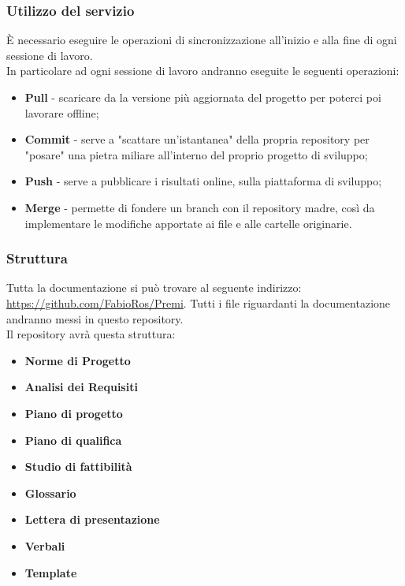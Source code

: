 		\subsubsection{Utilizzo del servizio}
È necessario eseguire le operazioni di sincronizzazione all'inizio e alla fine di ogni sessione di lavoro. \\
In particolare ad ogni sessione di lavoro andranno eseguite le seguenti operazioni:
\begin{itemize}
	\item \textbf{Pull} - scaricare da la versione più aggiornata del progetto per poterci poi lavorare offline;
	\item \textbf{Commit} - serve a "scattare un'istantanea" della propria \gls{repository} per "posare" una pietra miliare all'interno del proprio progetto di sviluppo;
	\item \textbf{Push} - serve a pubblicare i risultati online, sulla piattaforma di sviluppo;
	\item \textbf{Merge} - permette di fondere un \gls{branch} con il \gls{repository} madre, così da implementare le modifiche apportate ai file e alle cartelle originarie.
\end{itemize}

		\subsubsection{Struttura}
Tutta la documentazione si può trovare al seguente indirizzo: \url{https://github.com/FabioRos/Premi}. Tutti i file riguardanti la documentazione andranno messi in questo \gls{repository}. \\
Il \gls{repository} avrà questa struttura:
\begin{itemize}
	\item \textbf{Norme di Progetto}
	\item \textbf{Analisi dei Requisiti}
	\item \textbf{Piano di progetto}
	\item \textbf{Piano di qualifica}
	\item \textbf{Studio di fattibilità}
	\item \textbf{Glossario}
	\item \textbf{Lettera di presentazione}
	\item \textbf{Verbali}
	\item \textbf{Template}
\end{itemize}

